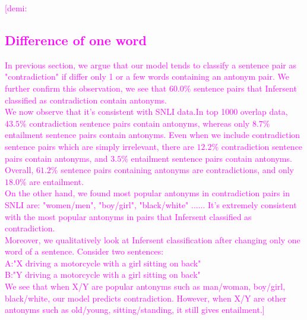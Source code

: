 \documentclass[10pt,letterpaper]{article}
\newcommand{\demi}[1]{\textcolor{magenta}{[demi: #1]}}
\begin{document}
\demi{
\subsection{Difference of one word}
In previous section, we argue that our model tends to classify a sentence pair as "contradiction" if differ only 1 or a few words containing an antonym pair. 
 We further confirm this observation, we see that $60.0 \%$ sentence pairs that Infersent classified as contradiction contain antonyms.\\ We now observe that it's consistent with SNLI data.In top 1000 overlap data, $43.5 \%$ contradiction sentence pairs contain antonyms, whereas only $8.7 \%$ entailment sentence pairs contain antonyms. Even when we include contradiction sentence pairs which are simply irrelevant, there are $12.2 \%$ contradiction sentence pairs contain antonyms, and $3.5 \%$ entailment sentence pairs contain antonyms. Overall, $61.2 \%$ sentence pairs containing antonyms are contradictions, and only $18.0 \%$ are entailment.\\ 
On the other hand, we found most popular antonyms in contradiction pairs in SNLI are: "women/men", "boy/girl", "black/white" ...... It's extremely consistent with the most popular antonyms in pairs that Infersent classified as contradiction.\\
Moreover, we qualitatively look at Infersent classification after changing only one word of a sentence. Consider two sentences:\\
A:"X driving a motorcycle with a girl sitting on back"\\
B:"Y driving a motorcycle with a girl sitting on back"\\
We see that when X/Y are popular antonyms such as man/woman, boy/girl, black/white, our model predicts contradiction. However, when X/Y are other antonyms such as old/young, sitting/standing, it still gives entailment.}
\end{document}
